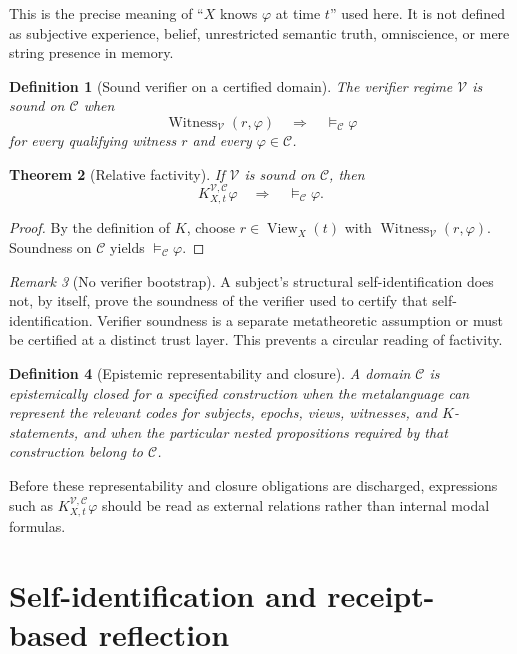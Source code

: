 \documentclass[11pt]{article}
\newtheorem{definition}{Definition}[section]
\newtheorem{theorem}[definition]{Theorem}
\theoremstyle{remark}
\newtheorem{remark}[definition]{Remark}
\newcommand{\View}{\operatorname{View}}
\newcommand{\Witness}{\operatorname{Witness}}
\newcommand{\Sem}{\models_{\mathcal C}}
\newcommand{\K}[4]{K^{#3,#4}_{#1,#2}}
\begin{document}
This is the precise meaning of ``$X$ knows $\varphi$ at time $t$'' used here. It is not defined as subjective experience, belief, unrestricted semantic truth, omniscience, or mere string presence in memory.

\begin{definition}[Sound verifier on a certified domain]
The verifier regime $\mathcal V$ is \emph{sound on $\mathcal C$} when
\[
\Witness_{\mathcal V}(r,\varphi)\quad\Longrightarrow\quad \Sem\varphi
\]
for every qualifying witness $r$ and every $\varphi\in\mathcal C$.
\end{definition}

\begin{theorem}[Relative factivity]
If $\mathcal V$ is sound on $\mathcal C$, then
\[
\K{X}{t}{\mathcal V}{\mathcal C}\varphi\quad\Longrightarrow\quad \Sem\varphi.
\]
\end{theorem}
\begin{proof}
By the definition of $K$, choose $r\in\View_X(t)$ with $\Witness_{\mathcal V}(r,\varphi)$. Soundness on $\mathcal C$ yields $\Sem\varphi$.
\end{proof}

\begin{remark}[No verifier bootstrap]
A subject's structural self-identification does not, by itself, prove the soundness of the verifier used to certify that self-identification. Verifier soundness is a separate metatheoretic assumption or must be certified at a distinct trust layer. This prevents a circular reading of factivity.
\end{remark}

\begin{definition}[Epistemic representability and closure]
A domain $\mathcal C$ is \emph{epistemically closed for a specified construction} when the metalanguage can represent the relevant codes for subjects, epochs, views, witnesses, and $K$-statements, and when the particular nested propositions required by that construction belong to $\mathcal C$.
\end{definition}

Before these representability and closure obligations are discharged, expressions such as $\K{X}{t}{\mathcal V}{\mathcal C}\varphi$ should be read as external relations rather than internal modal formulas.

\section{Self-identification and receipt-based reflection}
\end{document}
